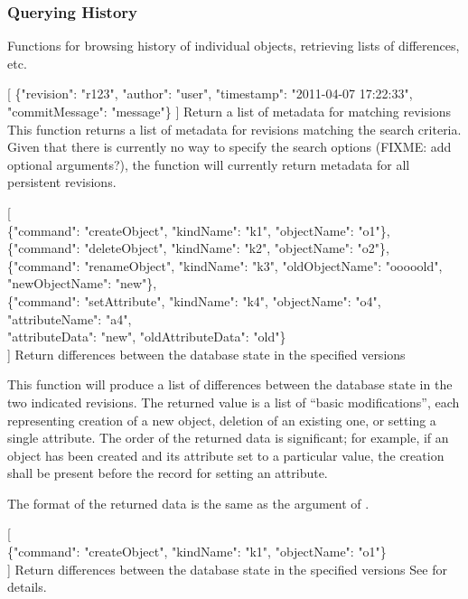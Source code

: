\documentclass{article}
\begin{document}
\subsubsection{Querying History}
\label{sec:api-group-history}

Functions for browsing history of individual objects, retrieving lists of differences, etc.

    {[
    \{"revision": "r123", "author": "user", "timestamp": "2011-04-07 17:22:33", "commitMessage": "message"\}
    ]}
    {Return a list of metadata for matching revisions}
    {This function returns a list of metadata for revisions matching the search criteria.  Given that there is currently
    no way to specify the search options (FIXME: add optional arguments?), the function will currently return metadata
    for all persistent revisions.}

    {[ \\
    \{"command": "createObject", "kindName": "k1", "objectName": "o1"\}, \\
    \{"command": "deleteObject", "kindName": "k2", "objectName": "o2"\}, \\
    \{"command": "renameObject", "kindName": "k3", "oldObjectName": "ooooold", "newObjectName": "new"\}, \\
    \{"command": "setAttribute", "kindName": "k4", "objectName": "o4", "attributeName": "a4", \\
        "attributeData": "new", "oldAttributeData": "old"\} \\
    ]}
    {Return differences between the database state in the specified versions}
    {This function will produce a list of differences between the database state in the two indicated revisions.  The
    returned value is a list of ``basic modifications'', each representing creation of a new object, deletion of an
    existing one, or setting a single attribute.  The order of the returned data is significant; for example, if an
    object has been created and its attribute set to a particular value, the creation shall be present before the record
    for setting an attribute.

    The format of the returned data is the same as the argument of .}

    {[ \\
    \{"command": "createObject", "kindName": "k1", "objectName": "o1"\} \\
    ]}
    {Return differences between the database state in the specified versions}
    {See  for details.}
\end{document}

